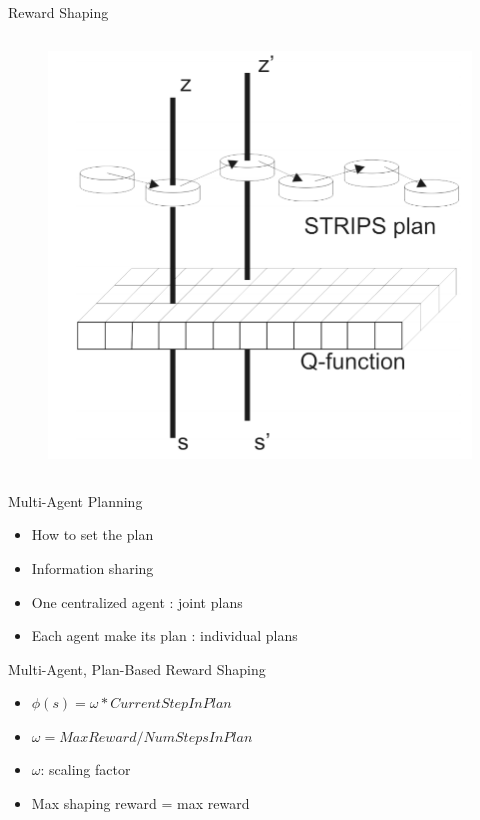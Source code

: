 \documentclass{bredelebeamer}
\begin{document}
\begin{frame}{Reward Shaping}
\begin{columns}[onlytextwidth]
\begin{column}{0.4\linewidth}
\begin{figure}[h!]
\centering
  \includegraphics[width = \linewidth]{../article/img/strips.png}
  \label{fig:strips}
\end{figure}

\end{column}

\end{columns}

\end{frame}


\begin{frame}

\begin{block}{Multi-Agent Planning}
\begin{itemize}
\item How to set the plan
\item Information sharing
\item One centralized agent : joint plans
\item Each agent make its plan : individual plans
\end{itemize}
\end{block}

\begin{block}{Multi-Agent, Plan-Based Reward Shaping}
\begin{itemize}
\item $\phi (s) = \omega * CurrentStepInPlan$
\item $\omega = MaxReward/NumStepsInPlan$
\item $\omega$: scaling factor
\item Max shaping reward = max reward
\end{itemize}
\end{block}

\end{frame}
\end{document}
